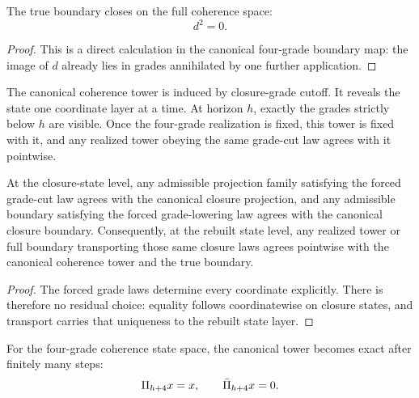 \begin{theorem}\label{thm:full-boundary-closes}
The true boundary closes on the full coherence space:
\[
d^2=0.
\]
\end{theorem}

\begin{proof}
This is a direct calculation in the canonical four-grade boundary map: the
image of $d$ already lies in grades annihilated by one further application.
\end{proof}

\begin{definition}\label{def:coherence-tower}
The canonical coherence tower is induced by closure-grade cutoff. It reveals
the state one coordinate layer at a time. At horizon $h$, exactly the grades
strictly below $h$ are visible. Once the four-grade realization is fixed, this
tower is fixed with it, and any realized tower obeying the same grade-cut law
agrees with it pointwise.
\end{definition}

\begin{theorem}\label{thm:realized-uniqueness}
At the closure-state level, any admissible projection family satisfying the
forced grade-cut law agrees with the canonical closure projection, and any
admissible boundary satisfying the forced grade-lowering law agrees with the
canonical closure boundary. Consequently, at the rebuilt state level, any
realized tower or full boundary transporting those same closure laws agrees
pointwise with the canonical coherence tower and the true boundary.
\end{theorem}

\begin{proof}
The forced grade laws determine every coordinate explicitly. There is therefore
no residual choice: equality follows coordinatewise on closure states, and
transport carries that uniqueness to the rebuilt state layer.
\end{proof}

\begin{lemma}\label{lem:coherence-tower-faithful}
For the four-grade coherence state space, the canonical tower becomes exact
after finitely many steps:
\[
\Pi_{h+4}x=x,
\qquad
\bar{\Pi}_{h+4}x=0.
\]
\end{lemma}

